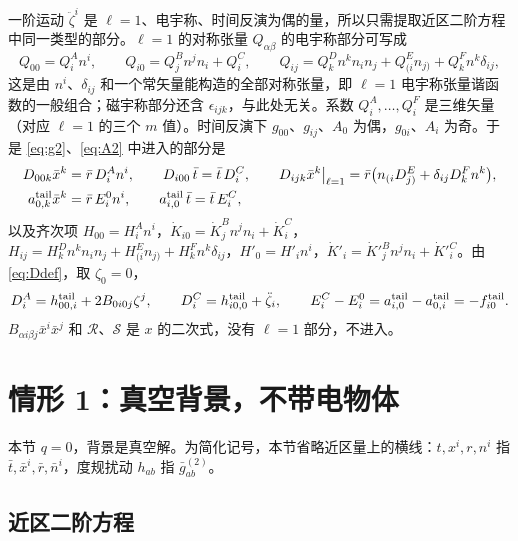 \documentclass[11pt,a4paper]{ctexart}
\numberwithin{equation}{section}
\begin{document}
一阶运动 $\ddot\zeta^i$ 是 $\ell=1$、电宇称、时间反演为偶的量，所以只需提取近区二阶方程中同一类型的部分。$\ell=1$ 的对称张量 $Q_{\alpha\beta}$ 的电宇称部分可写成
\begin{equation}
Q_{00}=Q^A_in^i,\qquad Q_{i0}=Q^B_jn^jn_i+Q^C_i,\qquad Q_{ij}=Q^D_kn^kn_in_j+Q^E_{(i}n_{j)}+Q^F_kn^k\delta_{ij},
\label{eq:harm}
\end{equation}
这是由 $n^i$、$\delta_{ij}$ 和一个常矢量能构造的全部对称张量，即 $\ell=1$ 电宇称张量谐函数的一般组合；磁宇称部分还含 $\epsilon_{ijk}$，与此处无关。系数 $Q^A_i,\dots,Q^F_i$ 是三维矢量（对应 $\ell=1$ 的三个 $m$ 值）。时间反演下 $g_{00}$、$g_{ij}$、$A_0$ 为偶，$g_{0i}$、$A_i$ 为奇。于是 \eqref{eq:g2}、\eqref{eq:A2} 中进入的部分是
\begin{align}
D_{00k}\bar x^k&=\bar r\,D^A_in^i,\qquad D_{i00}\,\bar t=\bar t\,D^C_i,\qquad
D_{ijk}\bar x^k\big|_{\ell=1}=\bar r\big(n_{(i}D^E_{j)}+\delta_{ij}D^F_kn^k\big),
\label{eq:Dharm}\\
a^{\rm tail}_{0,k}\bar x^k&=\bar r\,E^0_in^i,\qquad a^{\rm tail}_{i,0}\,\bar t=\bar t\,E^C_i,
\label{eq:Eharm}
\end{align}
以及齐次项 $H_{00}=H^A_in^i$，$\dot K_{i0}=\dot K^B_jn^jn_i+\dot K^C_i$，$H_{ij}=H^D_kn^kn_in_j+H^E_{(i}n_{j)}+H^F_kn^k\delta_{ij}$，$H'_0=H'_in^i$，$\dot K'_i=\dot K'^B_jn^jn_i+\dot K'^C_i$。由 \eqref{eq:Ddef}，取 $\zeta_0=0$，
\begin{equation}
D^A_i=h^{\rm tail}_{00,i}+2B_{0i0j}\zeta^j,\qquad D^C_i=h^{\rm tail}_{i0,0}+\ddot\zeta_i,\qquad
E^C_i-E^0_i=a^{\rm tail}_{i,0}-a^{\rm tail}_{0,i}=-f^{\rm tail}_{i0}.
\label{eq:DAC}
\end{equation}
$B_{\alpha i\beta j}\bar x^i\bar x^j$ 和 $\mathcal R$、$\mathcal S$ 是 $x$ 的二次式，没有 $\ell=1$ 部分，不进入。

\section{情形 1：真空背景，不带电物体}
\label{sec:L1}

本节 $q=0$，背景是真空解。为简化记号，本节省略近区量上的横线：$t,x^i,r,n^i$ 指 $\bar t,\bar x^i,\bar r,\bar n^i$，度规扰动 $h_{ab}$ 指 $\bar g^{(2)}_{ab}$。

\subsection{近区二阶方程}
\label{sec:L1eq}
\end{document}
